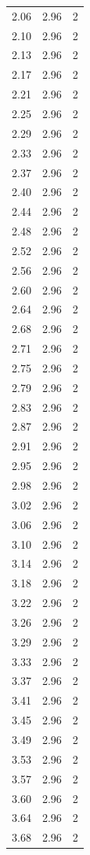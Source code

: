 \begin{longtable}{lrr}
  2.06 & 2.96 & 2 \\
  2.10 & 2.96 & 2 \\
  2.13 & 2.96 & 2 \\
  2.17 & 2.96 & 2 \\
  2.21 & 2.96 & 2 \\
  2.25 & 2.96 & 2 \\
  2.29 & 2.96 & 2 \\
  2.33 & 2.96 & 2 \\
  2.37 & 2.96 & 2 \\
  2.40 & 2.96 & 2 \\
  2.44 & 2.96 & 2 \\
  2.48 & 2.96 & 2 \\
  2.52 & 2.96 & 2 \\
  2.56 & 2.96 & 2 \\
  2.60 & 2.96 & 2 \\
  2.64 & 2.96 & 2 \\
  2.68 & 2.96 & 2 \\
  2.71 & 2.96 & 2 \\
  2.75 & 2.96 & 2 \\
  2.79 & 2.96 & 2 \\
  2.83 & 2.96 & 2 \\
  2.87 & 2.96 & 2 \\
  2.91 & 2.96 & 2 \\
  2.95 & 2.96 & 2 \\
  2.98 & 2.96 & 2 \\
  3.02 & 2.96 & 2 \\
  3.06 & 2.96 & 2 \\
  3.10 & 2.96 & 2 \\
  3.14 & 2.96 & 2 \\
  3.18 & 2.96 & 2 \\
  3.22 & 2.96 & 2 \\
  3.26 & 2.96 & 2 \\
  3.29 & 2.96 & 2 \\
  3.33 & 2.96 & 2 \\
  3.37 & 2.96 & 2 \\
  3.41 & 2.96 & 2 \\
  3.45 & 2.96 & 2 \\
  3.49 & 2.96 & 2 \\
  3.53 & 2.96 & 2 \\
  3.57 & 2.96 & 2 \\
  3.60 & 2.96 & 2 \\
  3.64 & 2.96 & 2 \\
  3.68 & 2.96 & 2 \\

\end{longtable}
